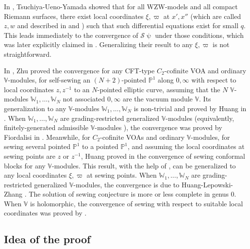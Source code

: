 \documentclass[12pt,a4paper,notitlepage]{article}
\theoremstyle{definition}
\theoremstyle{plain}
\newcommand{\mc}{\mathcal}
\newcommand{\Vbb}{\mathbb V}
\newcommand{\Wbb}{\mathbb W}
\newcommand{\Pbb}{\mathbb P}
\numberwithin{equation}{section}
\begin{document}
In \cite{TUY89}, Tsuchiya-Ueno-Yamada showed that for all WZW-models and all compact Riemann surfaces, there exist local coordinates $\xi,\varpi$ at $x',x''$ (which are called $z,w$ and described in \cite[Lemma 6.1.2]{TUY89} and \cite[Lemma 5.3.1]{Ueno97}) such that such differential equations exist for small $q$. This leads immediately to the convergence of $\mc S\uppsi$ under those conditions, which was later explicitly claimed in \cite[Thm. 5.3.4]{Ueno97}. Generalizing their result  to any $\xi,\varpi$ is not  straightforward.  


In \cite{Zhu96}, Zhu proved the convergence for any CFT-type $C_2$-cofinite VOA and ordinary $\Vbb$-modules,  for  self-sewing an $(N+2)$-pointed $\Pbb^1$ along $0,\infty$ with respect to local coordinates $z,z^{-1}$ to an $N$-pointed elliptic curve,  assuming that the $N$  $\Vbb$-modules $\Wbb_1,\dots,\Wbb_N$ not associated $0,\infty$ are the vacuum module $\Vbb$.  Its generalization to any $\Vbb$-modules $\Wbb_1,\dots,\Wbb_N$ is non-trivial and proved by Huang in \cite{Hua05b}. When  $\Wbb_1,\dots,\Wbb_N$ are grading-restricted generalized $\Vbb$-modules  (equivalently, finitely-generated admissible $\Vbb$-modules \cite{Hua09}), the convergence was proved by Fiordalisi in \cite{Fio16}.  Meanwhile, for $C_2$-cofinite VOAs and ordinary $\Vbb$-modules, for sewing several pointed $\Pbb^1$ to a pointed  $\Pbb^1$, and assuming the local coordinates at sewing points are $z$ or $z^{-1}$, Huang proved in \cite{Hua05a} the convergence of sewing conformal blocks for any $\Vbb$-modules. This result, with the help of \cite{Hua98}, can be generalized to any local coordinates $\xi,\varpi$ at sewing points. When $\Wbb_1,\dots,\Wbb_N$ are grading-restricted generalized $\Vbb$-modules, the convergence is due to Huang-Lepowski-Zhang \cite{HLZ11}.  The solution of sewing conjecture is more or less complete in genus $0$. When $\Vbb$ is holomorphic, the convergence of sewing with respect to suitable local coordinates was proved by \cite{Cod19}.




\subsection*{Idea of the proof}
\end{document}
